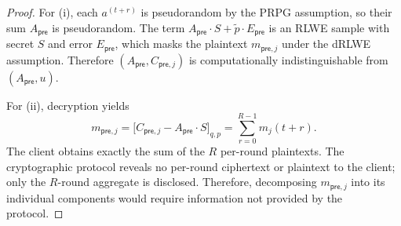 \documentclass[10pt]{article}
\begin{document}
\begin{proof}
For (i), each $a^{(t+r)}$ is pseudorandom by the PRPG assumption, so their sum $A_{\mathsf{pre}}$ is pseudorandom. The term $A_{\mathsf{pre}}\cdot S+\tilde{p}\cdot E_{\mathsf{pre}}$ is an RLWE sample with secret $S$ and error $E_{\mathsf{pre}}$, which masks the plaintext $m_{\mathsf{pre},j}$ under the dRLWE assumption. Therefore $(A_{\mathsf{pre}},C_{\mathsf{pre},j})$ is computationally indistinguishable from $(A_{\mathsf{pre}},u)$.

For (ii), decryption yields
\[
m_{\mathsf{pre},j}=\bigl[C_{\mathsf{pre},j}-A_{\mathsf{pre}}\cdot S\bigr]_{q,p}=\sum_{r=0}^{R-1}m_j(t+r).
\]
The client obtains exactly the sum of the $R$ per-round plaintexts. The cryptographic protocol reveals no per-round ciphertext or plaintext to the client; only the $R$-round aggregate is disclosed. Therefore, decomposing $m_{\mathsf{pre},j}$ into its individual components would require information not provided by the protocol.
\end{proof}
\end{document}
